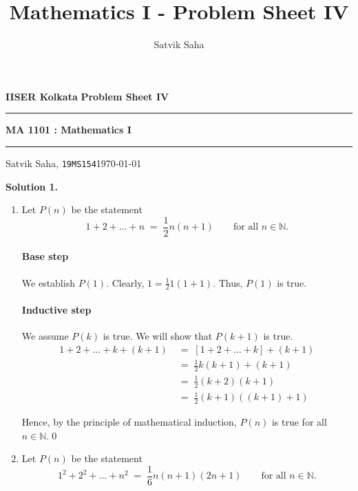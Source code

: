 \documentclass[10pt]{article}
\title{Mathematics I - Problem Sheet IV}
\author{Satvik Saha}
\date{}
\begin{document}
        \par\textbf{IISER Kolkata} \hfill \textbf{Problem Sheet IV}
        \vspace{3pt}
        \hrule
        \vspace{3pt}
        \begin{center}
                \LARGE{\textbf{MA 1101 : Mathematics I}}
        \end{center}
        \vspace{3pt}
        \hrule
        \vspace{3pt}
        Satvik Saha, \texttt{19MS154}\hfill\today
        \vspace{20pt}

        \textbf{Solution 1.}
        \begin{enumerate}
                \item Let $P(n)$ be the statement
                \[1 + 2 + \dots + n \;=\; \frac{1}{2}n(n + 1) \quad\quad\text{for all }n \in \mathbb{N}.\]
                \paragraph{Base step}
                We establish $P(1)$. Clearly, $1 = \frac{1}{2}1(1 + 1)$. Thus, $P(1)$ is true.
                \paragraph{Inductive step}
                We assume $P(k)$ is true. We will show that $P(k + 1)$ is true.
                \begin{align*}
                        1 + 2 + \dots + k + (k + 1)
                                \;&=\; [1 + 2 + \dots + k] + (k + 1) \\
                                \;&=\; \frac{1}{2}k(k + 1) + (k + 1) \tag{From $P(k)$}\\
                                \;&=\; \frac{1}{2}(k + 2)(k + 1) \\
                                \;&=\; \frac{1}{2}(k + 1)((k + 1) + 1)
                \end{align*}

                Hence, by the principle of mathematical induction, $P(n)$ is true for all $n \in \mathbb{N}$.\qed\\
                
                \item Let $P(n)$ be the statement
                \[1^2 + 2^2 + \dots + n^2 \;=\; \frac{1}{6}n(n + 1)(2n + 1) \quad\quad\text{for all }n \in \mathbb{N}.\]

\end{enumerate}
\end{document}
